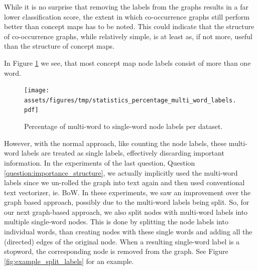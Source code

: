 While it is no surprise that removing the labels from the graphs results in a far lower classification score, the extent in which co-occurrence graphs still perform better than concept maps has to be noted.
This could indicate that the structure of co-occurrence graphs, while relatively simple, is at least as, if not more, useful than the structure of concept maps.


In Figure \ref{fig:statistics_percentage_multi_word_labels} we see, that most concept map node labels consist of more than one word.

\begin{figure}[htb!]
	\centering
	\texttt{[image: assets/figures/tmp/statistics\_percentage\_multi\_word\_labels.pdf]}
	\caption[Statistics: Percentage multi-word node labels]{Percentage of multi-word to single-word node labels per dataset.}\label{fig:statistics_percentage_multi_word_labels}
\end{figure}

However, with the normal approach, like counting the node labels, these multi-word labels are treated as single labels, effectively discarding important information.
In the experiments of the last question, Question \ref{question:importance_structure}, we actually implicitly used the multi-word labels since we un-rolled the graph into text again and then used conventional text vectorizer, ie. BoW.
In these experiments, we saw an improvement over the graph based approach, possibly due to the multi-word labels being split.
So, for our next graph-based approach, we also split nodes with multi-word labels into multiple single-word nodes.
This is done by splitting the node labels into individual words, than creating nodes with these single words and adding all the (directed) edges of the original node.
When a resulting single-word label is a stopword, the corresponding node is removed from the graph.
See Figure \ref{fig:example_split_labels} for an example.

